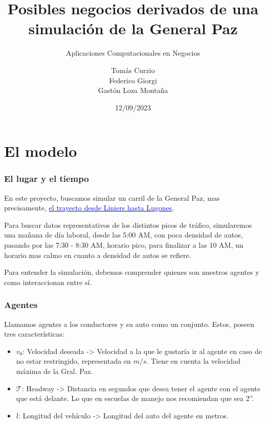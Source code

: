 \documentclass[10pt, compress]{beamer}
\title{Posibles negocios derivados de una simulaci\'on de la General Paz }
\subtitle{Aplicaciones Computacionales en Negocios}
\date{12/09/2023}
\author{Tom\'as Curzio \\ Federico Giorgi \\ Gast\'on Loza Monta\~na  }
\institute{Universidad Torcuato Di Tel}
\begin{document}
\maketitle

\section{El modelo}

\begin{frame}[fragile]

\frametitle{El lugar y el tiempo}
En este proyecto, buscamos simular un carril de la General Paz, mas precisamente, \href{https://www.google.com.ar/maps/dir/-34.6549026,-58.5273448/RN+A001,+Buenos+Aires/@-34.6307373,-58.5202617,14z}{\textcolor{blue}{el trayecto desde Liniers hasta Lugones}}. 

Para buscar datos representativos de los distintos picos de tr\'afico, simularemos una ma\~nana de d\'ia laboral, desde las 5:00 AM, con poca densidad de autos, pasando por las 7:30 - 8:30 AM, horario pico, para finalizar a las 10 AM, un horario mas calmo en cuanto a densidad de autos se refiere.

Para entender la simulaci\'on, debemos comprender quienes son nuestros agentes y como interaccionan entre s\'i.

\end{frame}

\begin{frame}[fragile]

\frametitle{Agentes}

Llamamos agentes a los conductores y su auto como un conjunto. Estos, poseen tres caracter\'isticas:

\begin{itemize}
\item $v_0$: Velocidad deseada -> Velocidad a la que le gustar\'ia ir al agente en caso de no estar restringido, representada en $m/s$. Tiene en cuenta la velocidad m\'axima de la Gral. Paz.
\item $\mathcal{T}$: Headway -> Distancia en segundos que desea tener el agente con el agente que est\'a delante. Lo que en escuelas de manejo nos recomiendan que sea 2''.
\item $l$: Longitud del veh\'iculo -> Longitud del auto del agente en metros.
\end{itemize}

\end{frame}
\end{document}
